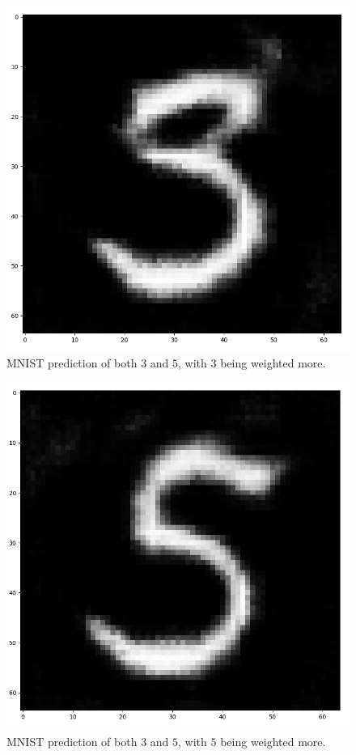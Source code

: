 \documentclass[10pt,twocolumn,letterpaper]{article}
\begin{document}
\begin{figure}[h!t]
   \centering
   \includegraphics[scale=0.39]{images/gen35with3weighted.png}
   \caption{MNIST prediction of both $3$ and $5$, with $3$ being weighted more.}
   \label{fig:mnist-3w5}
\end{figure}

\begin{figure}[h!t]
   \centering
   \includegraphics[scale=0.39]{images/gen35with5weighted.png}
   \caption{MNIST prediction of both $3$ and $5$, with $5$ being weighted more.}
   \label{fig:mnist-35w}
\end{figure}
\end{document}
